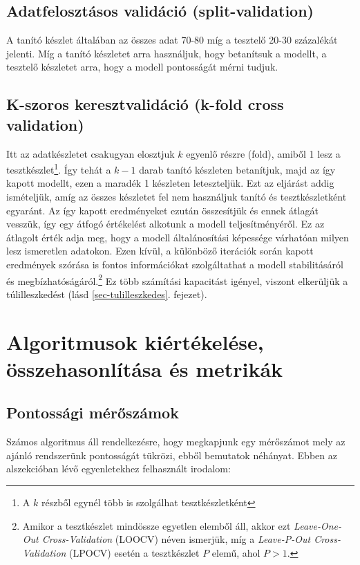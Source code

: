 \documentclass[
]{thesis-ekf}
\theoremstyle{definition}
\theoremstyle{remark}
\begin{document}
\subsection{Adatfelosztásos validáció (split-validation)}
\label{subsec-split-validation}
A tanító készlet általában az összes adat 70-80 míg a tesztelő 20-30 százalékát jelenti. Míg a tanító készletet arra használjuk, hogy betanítsuk a modellt, a tesztelő készletet arra, hogy a modell pontosságát mérni tudjuk.

\subsection{K-szoros keresztvalidáció (k-fold cross validation)}
\label{subsec-cross-validation}
Itt az adatkészletet csakugyan elosztjuk $k$ egyenlő részre (fold), amiből 1 lesz a tesztkészlet\footnote{A $k$ részből egynél több is szolgálhat tesztkészletként}. Így tehát a $k-1$ darab tanító készleten betanítjuk, majd az így kapott modellt, ezen a maradék 1 készleten leteszteljük. Ezt az eljárást addig ismételjük, amíg az összes készletet fel nem használjuk tanító és tesztkészletként egyaránt. Az így kapott eredményeket ezután összesítjük és ennek átlagát vesszük, így egy átfogó értékelést alkotunk a modell teljesítményéről. Ez az átlagolt érték adja meg, hogy a modell általánosítási képessége várhatóan milyen lesz ismeretlen adatokon. Ezen kívül, a különböző iterációk során kapott eredmények szórása is fontos információkat szolgáltathat a modell stabilitásáról és megbízhatóságáról.\footnote{Amikor a tesztkészlet mindössze egyetlen elemből áll, akkor ezt \emph{Leave-One-Out Cross-Validation} (LOOCV) néven ismerjük, míg a \emph{Leave-P-Out Cross-Validation} (LPOCV) esetén a tesztkészlet $P$ elemű, ahol $P>1$.} Ez több számítási kapacitást igényel, viszont elkerüljük a túlilleszkedést (lásd \ref{sec-tulilleszkedes}. fejezet).


\section{Algoritmusok kiértékelése, összehasonlítása és metrikák}
\label{sec-algoritmusok-kiertekelese}
\subsection{Pontossági mérőszámok}
Számos algoritmus áll rendelkezésre, hogy megkapjunk egy mérőszámot mely az ajánló rendszerünk pontosságát tükrözi, ebből bemutatok néhányat.
Ebben az alszekcióban lévő egyenletekhez felhasznált irodalom: \cite{szupercella:elorejelzesek-verifikacioja, surpriselib:accuracy-module}
\end{document}
